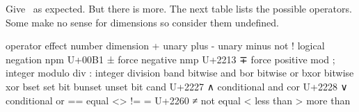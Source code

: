 Give \inlinebuffer\ as expected. But there is more. The next table lists the possible
operators. Some make no sense for dimensions so consider them undefined.

%

\starttabulate[|T|||c|c|]
\BC operator                                  \NC          \BC effect           \BC number \BC dimension \NC \NR
\NC +                                         \NC          \NC unary plus       \NC \star  \NC \star     \NC \NR
\NC -                                         \NC          \NC unary minus      \NC \star  \NC \star     \NC \NR
\NC not !                         \NC          \NC logical negation \NC \star  \NC           \NC \NR
\NC npm      \pm                              \NC U+00B1 ± \NC force negative   \NC \star  \NC           \NC \NR
\NC nmp      \mp                              \NC U+2213 ∓ \NC force positive   \NC \star  \NC           \NC \NR
\NC mod ;                       \NC          \NC integer modulo   \NC \star  \NC \star     \NC \NR
\NC div :                                     \NC          \NC integer division \NC \star  \NC \star     \NC \NR
\NC band                      \NC          \NC bitwise and      \NC \star  \NC           \NC \NR
\NC bor                             \NC          \NC bitwise or       \NC \star  \NC           \NC \NR
\NC bxor                                      \NC          \NC bitwise xor      \NC \star  \NC           \NC \NR
\NC bset                                      \NC          \NC set bit          \NC \star  \NC           \NC \NR
\NC bunset                                    \NC          \NC unset bit        \NC \star  \NC           \NC \NR
\NC cand      \NC U+2227 ∧ \NC conditional and  \NC \star  \NC           \NC \NR
\NC cor                   \NC U+2228 ∨ \NC conditional or   \NC \star  \NC           \NC \NR
\NC ==                                        \NC          \NC equal            \NC \star  \NC \star     \NC \NR
\NC <> !=    =                    \NC U+2260 ≠ \NC not equal        \NC \star  \NC \star     \NC \NR
\NC <                                         \NC          \NC less than        \NC \star  \NC \star     \NC \NR
\NC >                                         \NC          \NC more than        \NC \star  \NC \star     \NC \NR
